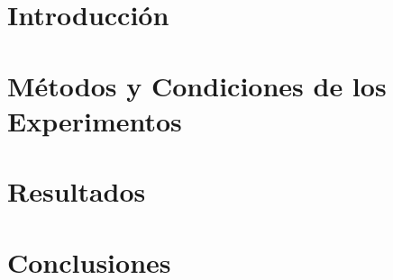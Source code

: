 \documentclass[10pt, a4paper]{article}
\begin{document}
	
	
	\maketitle
	
	\section{Introducción}
		
	
	\section{Métodos y Condiciones de los Experimentos}
	

	\section{Resultados}
	
	
	\section{Conclusiones}
	
	
\end{document}
